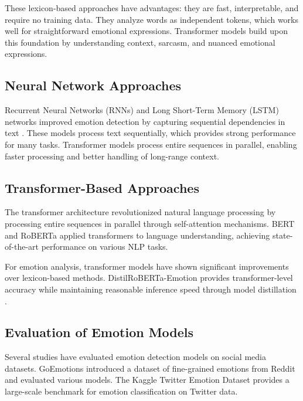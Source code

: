 These lexicon-based approaches have advantages: they are fast, interpretable, and require no training data. They analyze words as independent tokens, which works well for straightforward emotional expressions. Transformer models build upon this foundation by understanding context, sarcasm, and nuanced emotional expressions.

\subsection{Neural Network Approaches}

Recurrent Neural Networks (RNNs) and Long Short-Term Memory (LSTM) networks improved emotion detection by capturing sequential dependencies in text \cite{hochreiter1997long}. These models process text sequentially, which provides strong performance for many tasks. Transformer models process entire sequences in parallel, enabling faster processing and better handling of long-range context.

\subsection{Transformer-Based Approaches}

The transformer architecture \cite{vaswani2017attention} revolutionized natural language processing by processing entire sequences in parallel through self-attention mechanisms. BERT \cite{devlin2018bert} and RoBERTa \cite{liu2019roberta} applied transformers to language understanding, achieving state-of-the-art performance on various NLP tasks.

For emotion analysis, transformer models have shown significant improvements over lexicon-based methods. DistilRoBERTa-Emotion \cite{hartmann2023emotion} provides transformer-level accuracy while maintaining reasonable inference speed through model distillation \cite{sanh2019distilbert}.

\subsection{Evaluation of Emotion Models}

Several studies have evaluated emotion detection models on social media datasets. GoEmotions \cite{go2018emotions} introduced a dataset of fine-grained emotions from Reddit and evaluated various models. The Kaggle Twitter Emotion Dataset provides a large-scale benchmark for emotion classification on Twitter data.

